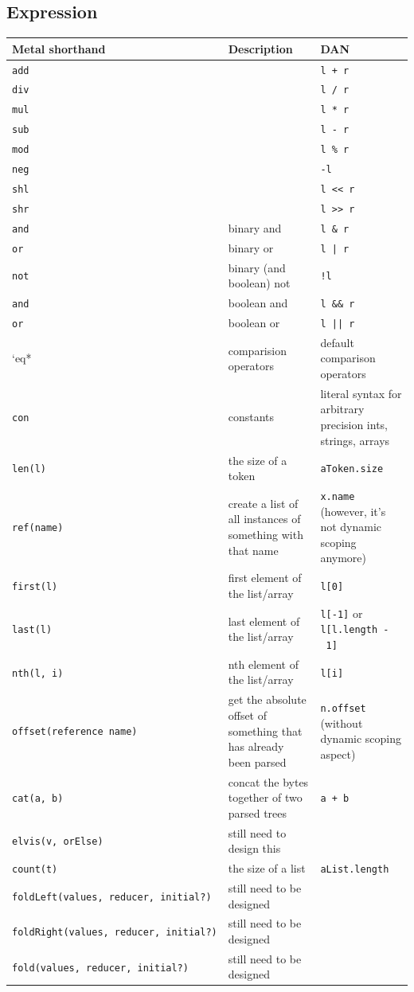 \documentclass[10pt,oneside]{article}
\begin{document}
\hypertarget{expression}{%
\subsection{Expression}\label{expression}}

\renewcommand*{\arraystretch}{1.4}
\begin{longtable}[]{@{}p{5cm} p{4.5cm} p{5.5cm}@{}}
\toprule
Metal shorthand & Description & DAN\tabularnewline
\midrule
\endhead
\texttt{add} & & \texttt{l\ +\ r}\tabularnewline
\texttt{div} & & \texttt{l\ /\ r}\tabularnewline
\texttt{mul} & & \texttt{l\ *\ r}\tabularnewline
\texttt{sub} & & \texttt{l\ -\ r}\tabularnewline
\texttt{mod} & & \texttt{l\ \%\ r}\tabularnewline
\texttt{neg} & & \texttt{-l}\tabularnewline
\texttt{shl} & & \texttt{l\ \textless{}\textless{}\ r}\tabularnewline
\texttt{shr} & &
\texttt{l\ \textgreater{}\textgreater{}\ r}\tabularnewline
\texttt{and} & binary and & \texttt{l\ \&\ r}\tabularnewline
\texttt{or} & binary or & \texttt{l\ | r}\tabularnewline
\texttt{not} & binary (and boolean) not & \texttt{!l}\tabularnewline
\texttt{and} & boolean and & \texttt{l\ \&\&\ r}\tabularnewline
\texttt{or} & boolean or & \texttt{l\ || r}\tabularnewline
`eq* & comparision operators & default comparison
operators\tabularnewline
\texttt{con} & constants & literal syntax for arbitrary precision ints,
strings, arrays\tabularnewline
\texttt{len(l)} & the size of a token &
\texttt{aToken.size}\tabularnewline
\texttt{ref(name)} & create a list of all instances of something with
that name & \texttt{x.name} (however, it's not dynamic scoping
anymore)\tabularnewline
\texttt{first(l)} & first element of the list/array &
\texttt{l{[}0{]}}\tabularnewline
\texttt{last(l)} & last element of the list/array & \texttt{l{[}-1{]}}
or \texttt{l{[}l.length\ -\ 1{]}}\tabularnewline
\texttt{nth(l,\ i)} & nth element of the list/array &
\texttt{l{[}i{]}}\tabularnewline
\texttt{offset(reference\ name)} & get the absolute offset of something
that has already been parsed & \texttt{n.offset} (without dynamic
scoping aspect)\tabularnewline
\texttt{cat(a,\ b)} & concat the bytes together of two parsed trees &
\texttt{a\ +\ b}\tabularnewline
\texttt{elvis(v,\ orElse)} & still need to design this &\tabularnewline
\texttt{count(t)} & the size of a list &
\texttt{aList.length}\tabularnewline
\texttt{foldLeft(values,\ reducer,\ initial?)} & still need to be
designed &\tabularnewline
\texttt{foldRight(values,\ reducer,\ initial?)} & still need to be
designed &\tabularnewline
\texttt{fold(values,\ reducer,\ initial?)} & still need to be designed &

\end{longtable}
\end{document}
